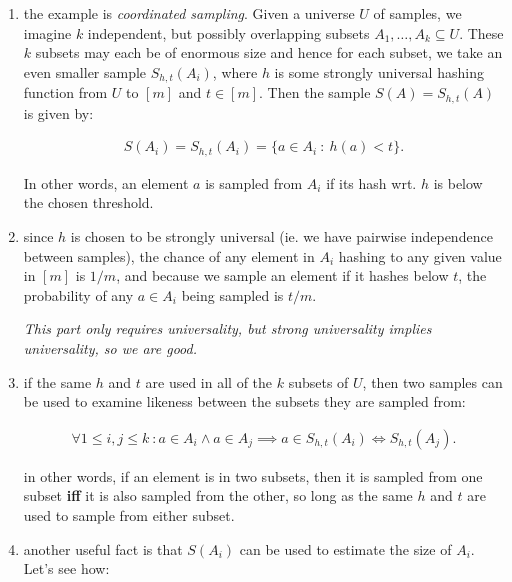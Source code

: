 \begin{enumerate}
      \item the example is \emph{coordinated sampling}. Given a universe $U$ of
        samples, we imagine $k$ independent, but possibly overlapping subsets
        $A_1, \dots, A_k \subseteq U$. These $k$ subsets may each be of enormous
        size and hence for each subset, we take an even smaller sample $S_{h,
        t}(A_i)$, where $h$ is some strongly universal hashing function from $U$
        to $[m]$ and $t \in [m]$. Then the sample $S(A) = S_{h, t}(A)$ is given
        by:
        \begin{textred}
          \begin{align}
            S(A_i) = S_{h, t}(A_i) = \{a \in A_i \ :\  h(a) < t\}.
          \end{align}
        \end{textred}

        In other words, an element $a$ is sampled from $A_i$ if its hash wrt.
        $h$ is below the chosen threshold.

      \item since $h$ is chosen to be strongly universal (ie. we have pairwise
        independence between samples), the chance of any element in $A_i$
        hashing to any given value in $[m]$ is $1/m$, and because we sample an
        element if it hashes below $t$, the probability of any $a \in A_i$ being
        sampled is $t / m$.

        \emph{This part only requires universality, but strong universality
        implies universality, so we are good.}

      \item if the same $h$ and $t$ are used in all of the $k$ subsets of $U$,
        then two samples can be used to examine likeness between the subsets
        they are sampled from:

        \begin{textred}
          \begin{align}
            \forall 1 \leq i, j \leq k\ : a \in A_i \land a \in A_j \implies a
            \in S_{h, t}(A_i) \iff S_{h, t}(A_j).
          \end{align}
        \end{textred}

        in other words, if an element is in two subsets, then it is sampled from
        one subset \textbf{iff} it is also sampled from the other, so long as
        the same $h$ and $t$ are used to sample from either subset. 

 
      \item another useful fact is that $S(A_i)$ can be used to estimate the
        size of $A_i$. Let's see how:


\end{enumerate}
